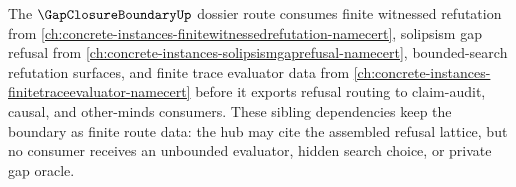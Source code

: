 The $\GapClosureBoundaryUp$ dossier route consumes finite witnessed refutation from \autoref{ch:concrete-instances-finitewitnessedrefutation-namecert}, solipsism gap refusal from \autoref{ch:concrete-instances-solipsismgaprefusal-namecert}, bounded-search refutation surfaces, and finite trace evaluator data from \autoref{ch:concrete-instances-finitetraceevaluator-namecert} before it exports refusal routing to claim-audit, causal, and other-minds consumers. These sibling dependencies keep the boundary as finite route data: the hub may cite the assembled refusal lattice, but no consumer receives an unbounded evaluator, hidden search choice, or private gap oracle.
